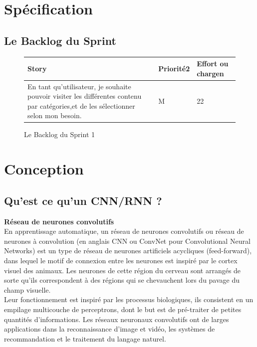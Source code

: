 
\section{Spécification}
\subsection{Le Backlog du Sprint}
\begin{figure}[H]
\begin{tabular}{|p{7cm}|p{4cm}|p{4cm}|}
\hline
\textbf{Story} & \textbf{Priorité2 } & \textbf{Effort ou chargen} \\
\hline
En tant qu'utilisateur, je souhaite pouvoir visiter les différentes contenu par catégories,et de les sélectionner selon mon besoin. & \begin{center}M\end{center} & \begin{center}22\end{center}\\
\hline
\end{tabular}
  \caption{Le Backlog du Sprint 1}
  \label{fig:Backlog1}
\end{figure}


\section{Conception}

\subsection{Qu'est ce qu'un CNN/RNN ?}
\textbf{Réseau de neurones convolutifs}\\[0.5cm]
En apprentissage automatique, un réseau de neurones convolutifs ou réseau de neurones à convolution (en anglais CNN ou ConvNet pour Convolutional Neural Networks) est un type de réseau de neurones artificiels acycliques (feed-forward), dans lequel le motif de connexion entre les neurones est inspiré par le cortex visuel des animaux. Les neurones de cette région du cerveau sont arrangés de sorte qu'ils correspondent à des régions qui se chevauchent lors du pavage du champ visuelle.\\[0.2cm]
 Leur fonctionnement est inspiré par les processus biologiques, ils consistent en un empilage multicouche de perceptrons, dont le but est de pré-traiter de petites quantités d'informations. Les réseaux neuronaux convolutifs ont de larges applications dans la reconnaissance d'image et vidéo, les systèmes de recommandation et le traitement du langage naturel.\\[1cm]

